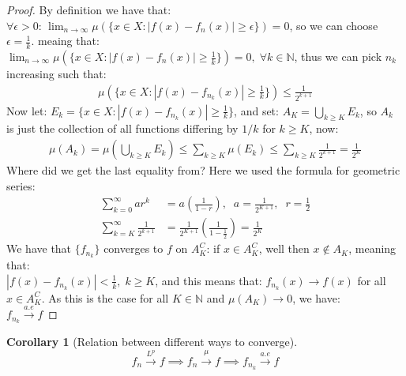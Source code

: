 \documentclass{article}
\newcommand{\N}{\mathbb{N}}
\newtheorem{proof}{Proof}
\newtheorem{cor}{Corollary}
\begin{document}
\begin{proof}
By definition we have that: \\ 
$\forall \epsilon>0$: $\lim_{n\to \infty}\mu(\{x\in X: |f(x)-f_{n}(x)|\geq \epsilon\}) = 0$, so we can choose $\epsilon = \frac{1}{k}$. meaing that: \\ 
$\lim_{n\to \infty}\mu(\{x\in X: |f(x)-f_{n}(x)|\geq \frac{1}{k} \}) = 0,\; \forall k\in \N$, thus we can pick $n_{k}$ increasing such that: 
\begin{align*}
\mu(\{x\in X: |f(x)-f_{n_{k}}(x)|\geq \frac{1}{k} \}) \leq \frac{1}{2^{k+1}} 
\end{align*}
Now let: $E_{k} = \{x\in X: |f(x)-f_{n_{k}}(x)|\geq \frac{1}{k}\}$, and set: 
$A_{K} = \bigcup_{k\geq K}E_{k}$, so $A_{k}$ is just the collection of all functions differing by $1/k$ for $k\geq K$, now: 
\begin{align*}
\mu(A_{k}) = \mu\left(\bigcup_{k\geq K}E_{k}\right) \leq \sum_{k\geq K}\mu(E_{k}) \leq \sum_{k\geq K}\frac{1}{2^{k+1}} = \frac{1}{2^{K}}    
\end{align*}
Where did we get the last equality from? Here we used the formula for geometric series: 
\begin{align*}
\sum_{k=0}^{\infty}ar^{k} &= a\left(\frac{1}{1-r}\right), \;\;
a = \frac{1}{2^{K+1}}, \;\;
r=\frac{1}{2}\\ 
\sum_{k=K}^{\infty}\frac{1}{2^{k+1}} &= \frac{1}{2^{K+1}}\left(
\frac{1}{1 - \frac{1}{2}} \right) = \frac{1}{2^{K}}
\end{align*}
We have that $\{f_{n_{k}}\}$ converges to $f$ on $A_{K}^{C}$: if $x\in A_{K}^{C}$, well then $x\not\in A_{K}$, meaning that: \\
$|f(x) - f_{n_{k}}(x)| < \frac{1}{k}, \; k\geq K$, and this means that: 
$f_{n_{k}}(x) \to f(x)$ for all $x\in A_{K}^{C}$. As this is the case for all $K\in \N$ and $\mu(A_{K}) \to 0$, we have: \\ 
$f_{n_{k}} \overset{a.e}{\longrightarrow} f$
\end{proof}

\begin{cor}[Relation between different ways to converge]
\[f_{n} \overset{L^{p}}{\longrightarrow} f \implies f_{n} \overset{\mu}{\longrightarrow} f \implies f_{n_{k}} \overset{a.e}{\longrightarrow} f
\]
\end{cor}

\printbibliography
\end{document}
